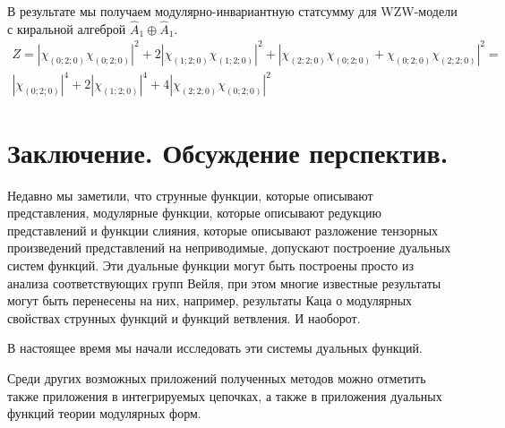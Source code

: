 \documentclass[a4paper,12pt]{article}
\theoremstyle{definition} \newtheorem{Def}{Definition}
\begin{document}
В результате мы получаем модулярно-инвариантную статсумму для WZW-модели с киральной алгеброй $\hat{A}_1\oplus \hat{A}_1$.
\begin{multline}
  \label{eq:40}
  Z=\left|\chi_{(0;2;0)}\chi_{(0;2;0)}\right|^2+2\left|\chi_{(1;2;0)}\chi_{(1;2;0)}\right|^2+ \left|\chi_{(2;2;0)}\chi_{(0;2;0)}+\chi_{(0;2;0)}\chi_{(2;2;0)}\right|^2=\\
  \left|\chi_{(0;2;0)}\right|^4+2\left|\chi_{(1;2;0)}\right|^4+ 4\left|\chi_{(2;2;0)}\chi_{(0;2;0)}\right|^2
\end{multline}

\section{Заключение. Обсуждение перспектив.}
\label{sec:conlusion}

Недавно мы заметили, что струнные функции, которые описывают представления, модулярные функции,
которые описывают редукцию представлений и функции слияния, которые описывают разложение тензорных
произведений представлений на неприводимые, допускают построение дуальных систем функций. Эти
дуальные функции могут быть построены просто из анализа соответствующих групп Вейля, при этом многие
известные результаты могут быть перенесены на них, например, результаты Каца о модулярных свойствах
струнных функций и функций ветвления. И наоборот. 

В настоящее время мы начали исследовать эти системы дуальных функций. 

Среди других возможных приложений полученных методов можно отметить также приложения в интегрируемых
цепочках, а также в приложения дуальных функций теории модулярных форм. 
\end{document}
